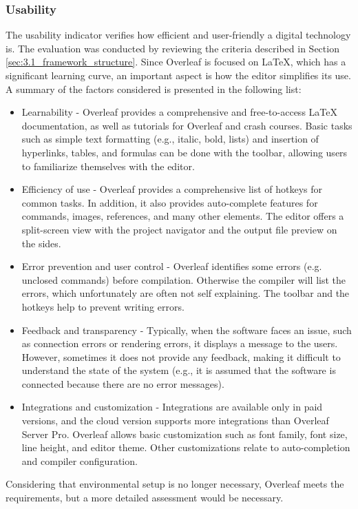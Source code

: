 \subsubsection{Usability}
The usability indicator verifies how efficient and user-friendly a digital technology is. The evaluation was conducted by reviewing the criteria described in Section \ref{sec:3.1_framework_structure}. Since Overleaf is focused on LaTeX, which has a significant learning curve, an important aspect is how the editor simplifies its use. A summary of the factors considered is presented in the following list:
\begin{itemize}[noitemsep, topsep=4pt, parsep=0pt, partopsep=0pt]
    \item Learnability - Overleaf provides a comprehensive and free-to-access LaTeX documentation, as well as tutorials for Overleaf and crash courses. Basic tasks such as simple text formatting (e.g., italic, bold, lists) and insertion of hyperlinks, tables, and formulas can be done with the toolbar, allowing users to familiarize themselves with the editor.
    \item Efficiency of use - Overleaf provides a comprehensive list of hotkeys for common tasks. In addition, it also provides auto-complete features for commands, images, references, and many other elements. The editor offers a split-screen view with the project navigator and the output file preview on the sides.
    \item Error prevention and user control - Overleaf identifies some errors (e.g. unclosed commands) before compilation. Otherwise the compiler will list the errors, which unfortunately are often not self explaining. The toolbar and the hotkeys help to prevent writing errors.
    \item Feedback and transparency - Typically, when the software faces an issue, such as connection errors or rendering errors, it displays a message to the users. However, sometimes it does not provide any feedback, making it difficult to understand the state of the system (e.g., it is assumed that the software is connected because there are no error messages).   
    \item Integrations and customization - Integrations are available only in paid versions, and the cloud version supports more integrations than Overleaf Server Pro. Overleaf allows basic customization such as font family, font size, line height, and editor theme. Other customizations relate to auto-completion and compiler configuration.
\end{itemize}
Considering that environmental setup is no longer necessary, Overleaf meets the requirements, but a more detailed assessment would be necessary. 

